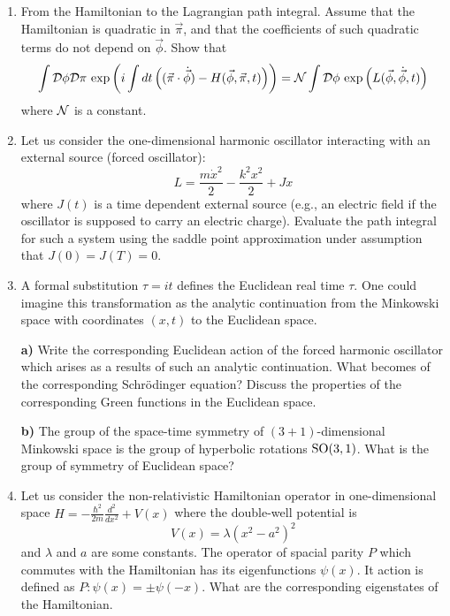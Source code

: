 \documentclass[a4paper,11pt]{article}
\begin{document}
\begin{enumerate}
\item From the Hamiltonian to the Lagrangian path integral. Assume
  that the Hamiltonian is quadratic in $\vec{ \pi }$, and that the
  coefficients of such quadratic terms do not depend on
  $\vec{ \phi }$. Show that
  \begin{equation}
    \label{eq:34}
    \int \mathcal{D} \phi \mathcal{D} \pi \, \exp\left( i \int dt \left( ( \vec{ \pi }
        \cdot \dot{ \vec{ \phi } } ) - H( \vec{ \phi }, \vec{ \pi }, t )
      \right) \right)
    =
    \mathcal{N} \int \mathcal{D} \phi \, \exp\left( L( \vec{ \phi }, \dot{ \vec{ \phi } }, t )
    \right)
  \end{equation}
  where $\mathcal{N}$ is a constant.

\item Let us consider the one-dimensional harmonic oscillator
  interacting with an external source (forced oscillator):
  \begin{equation}
    \label{eq:35}
    L =
    \frac{ m \dot{ x }^{ 2 } }{ 2 } - \frac{ k^{ 2 } x^{ 2 } }{ 2 } + J x
  \end{equation}
  where $J( t )$ is a time dependent external source (e.g., an
  electric field if the oscillator is supposed to carry an electric
  charge). Evaluate the path integral for such a system using the
  saddle point approximation under assumption that
  $J( 0 ) = J( T ) = 0$.

\item A formal substitution $\tau = it$ defines the Euclidean real time
  $\tau$. One could imagine this transformation as the analytic
  continuation from the Minkowski space with coordinates $( x, t )$ to
  the Euclidean space.

  \textbf{a)} Write the corresponding Euclidean action of the forced
  harmonic oscillator which arises as a results of such an analytic
  continuation. What becomes of the corresponding Schr\"{o}dinger
  equation? Discuss the properties of the corresponding Green
  functions in the Euclidean space.

  \textbf{b)} The group of the space-time symmetry of
  $( 3 + 1 )$-dimensional Minkowski space is the group of hyperbolic
  rotations $\mathrm{SO}( 3, 1 )$. What is the group of symmetry of Euclidean
  space?

\item Let us consider the non-relativistic Hamiltonian operator in
  one-dimensional space
  $H = -\frac{ \hbar^{ 2 } }{ 2m } \frac{ d^{ 2 } }{ dx^{ 2 } } + V( x )$
  where the double-well potential is
  \begin{equation}
    \label{eq:36}
    V( x ) = \lambda ( x^{ 2 } - a^{ 2 } )^{ 2 }
  \end{equation}
  and $\lambda$ and $a$ are some constants. The operator of spacial parity
  $P$ which commutes with the Hamiltonian has its eigenfunctions
  $\psi( x )$. It action is defined as
  $P : \psi( x ) = \pm\psi( -x )$. What are the corresponding eigenstates of
  the Hamiltonian.


\end{enumerate}
\end{document}
